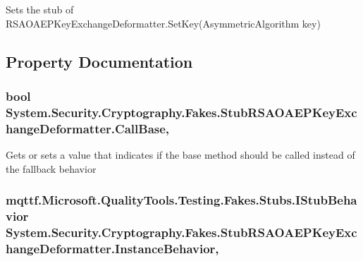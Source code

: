 Sets the stub of R\-S\-A\-O\-A\-E\-P\-Key\-Exchange\-Deformatter.\-Set\-Key(\-Asymmetric\-Algorithm key)



\subsection{Property Documentation}
\hypertarget{class_system_1_1_security_1_1_cryptography_1_1_fakes_1_1_stub_r_s_a_o_a_e_p_key_exchange_deformatter_a5144c8a13e6e432aab1be2c6d453b8be}{
\subsubsection[{Call\-Base}]{\setlength{\rightskip}{0pt plus 5cm}bool System.\-Security.\-Cryptography.\-Fakes.\-Stub\-R\-S\-A\-O\-A\-E\-P\-Key\-Exchange\-Deformatter.\-Call\-Base\hspace{0.3cm}{\ttfamily [get]}, {\ttfamily [set]}}}\label{class_system_1_1_security_1_1_cryptography_1_1_fakes_1_1_stub_r_s_a_o_a_e_p_key_exchange_deformatter_a5144c8a13e6e432aab1be2c6d453b8be}


Gets or sets a value that indicates if the base method should be called instead of the fallback behavior

\hypertarget{class_system_1_1_security_1_1_cryptography_1_1_fakes_1_1_stub_r_s_a_o_a_e_p_key_exchange_deformatter_adf1de6369d53b415205de2c1fb9ab693}{
\subsubsection[{Instance\-Behavior}]{\setlength{\rightskip}{0pt plus 5cm}mqttf.\-Microsoft.\-Quality\-Tools.\-Testing.\-Fakes.\-Stubs.\-I\-Stub\-Behavior System.\-Security.\-Cryptography.\-Fakes.\-Stub\-R\-S\-A\-O\-A\-E\-P\-Key\-Exchange\-Deformatter.\-Instance\-Behavior\hspace{0.3cm}{\ttfamily [get]}, {\ttfamily [set]}}}\label{class_system_1_1_security_1_1_cryptography_1_1_fakes_1_1_stub_r_s_a_o_a_e_p_key_exchange_deformatter_adf1de6369d53b415205de2c1fb9ab693}


